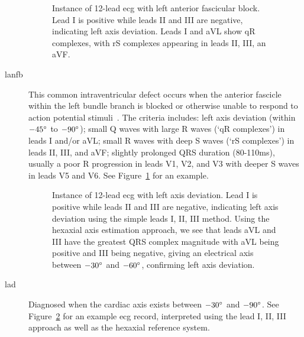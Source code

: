 \documentclass[\main/thesis.tex]{subfiles}
\begin{document}
\begin{description}
    \begin{figure}[H]
        \centering
        \caption{Instance of 12-lead \gls{ecg} with left anterior fascicular block. Lead I is positive while leads II and III are negative, indicating left axis deviation. Leads I and aVL show qR complexes, with rS complexes appearing in leads II, III, an aVF.}
        \label{fig:full_LAnFB}
    \end{figure} 
    \item[\gls{lanfb}] This common intraventricular defect occurs when the anterior fascicle within the left bundle branch is blocked or otherwise unable to respond to action potential stimuli~\cite{ecg-utah-lesson}. The criteria includes: left axis deviation (within $-45\degree$ to $-90\degree$); small Q waves with large R waves (`qR complexes') in leads I and/or aVL; small R waves with deep S waves (`rS complexes') in leads II, III, and aVF; slightly prolonged QRS duration (80-110ms), usually a poor R progression in leads V1, V2, and V3 with deeper S waves in leads V5 and V6. See Figure~\ref{fig:full_LAnFB} for an example.

    \begin{figure}[H]
        \centering
        \caption{Instance of 12-lead \gls{ecg} with left axis deviation. Lead I is positive while leads II and III are negative, indicating left axis deviation using the simple leads I, II, III method. Using the hexaxial axis estimation approach, we see that leads aVL and III have the greatest QRS complex magnitude with aVL being positive and III being negative, giving an electrical axis between $-30\degree$ and $-60\degree$, confirming left axis deviation.}
        \label{fig:full_LAD}
    \end{figure}
    \item[\gls{lad}] Diagnosed when the cardiac axis exists between $-30\degree$ and $-90\degree$. See Figure~\ref{fig:full_LAD} for an example \gls{ecg} record, interpreted using the lead I, II, III approach as well as the hexaxial reference system.


\end{description}
\end{document}
